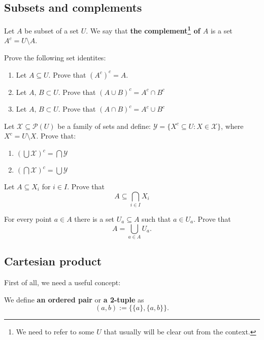 \subsection{Subsets and complements}
\begin{definition}
  Let $A$ be subset of a set $U$. We say that \textbf{the complement\footnote{We need to refer to some $U$ that usually will be clear out from the context.}
  of $A$} is a set $A^c=U\setminus A$.
\end{definition}


\begin{prob}
	Prove the following set identites:
	\begin{enumerate}
		\item Let $A\subseteq U.$ Prove that $(A^c)^c = A$.
		\item Let $A,\, B\subset U$. Prove that $(A\cup B)^c = A^c\cap B^c$
		\item Let $A,\, B\subset U$. Prove that $(A\cap B)^c = A^c\cup B^c$
	\end{enumerate}
\end{prob}

\begin{prob}
	Let $\mathcal X \subseteq \mathcal P(U)$ be a family of sets and define:
  $\mathcal Y=\{X^c\subseteq U : X\in \mathcal X\}$, where $X^c=U\setminus X$.
  Prove that:
  \begin{enumerate}
    \item $(\bigcup \mathcal X)^c = \bigcap \mathcal Y$
    \item $(\bigcap \mathcal X)^c = \bigcup \mathcal Y$
  \end{enumerate}
\end{prob}

\begin{exercise}
	Let $A\subseteq X_i$ for $i\in I$. Prove that
	$$A\subseteq \bigcap_{i\in I} X_i$$
\end{exercise}

\begin{exercise}
	For every point $a\in A$ there is a set $U_a\subseteq A$ such that $a\in U_a$.
	Prove that $$A=\bigcup_{a\in A} U_a.$$
\end{exercise}

\subsection{Cartesian product}
First of all, we need a useful concept:
\begin{definition}
  We define \textbf{an ordered pair} or \textbf{a 2-tuple} as
  $$(a,b) := \{\{a\}, \{a, b\}\}.$$
\end{definition}

